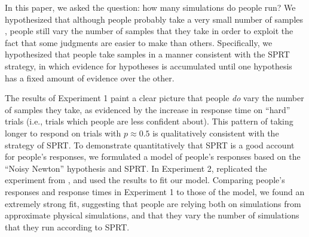 \documentclass[10pt,letterpaper]{article}
\begin{document}
In this paper, we asked the question: how many simulations do people run? We hypothesized that although people probably take a very small number of samples \cite{Vul:2014ba}, people still vary the number of samples that they take in order to exploit the fact that some judgments are easier to make than others. Specifically, we hypothesized that people take samples in a manner consistent with the SPRT strategy, in which evidence for hypotheses is accumulated until one hypothesis has a fixed amount of evidence over the other.

The results of Experiment 1 paint a clear picture that people \emph{do} vary the number of samples they take, as evidenced by the increase in response time on ``hard'' trials (i.e., trials which people are less confident about). This pattern of taking longer to respond on trials with $p\approx 0.5$ is qualitatively consistent with the strategy of SPRT. To demonstrate quantitatively that SPRT is a good account for people's responses, we formulated a model of people's responses based on the ``Noisy Newton'' hypothesis and SPRT. In Experiment 2, replicated the experiment from , and used the results to fit our model. Comparing people's responses and response times in Experiment 1 to those of the model, we found an extremely strong fit, suggesting that people are relying both on simulations from approximate physical simulations, and that they vary the number of simulations that they run according to SPRT.



\setlength{\bibleftmargin}{.125in}
\setlength{\bibindent}{-\bibleftmargin}


\end{document}
